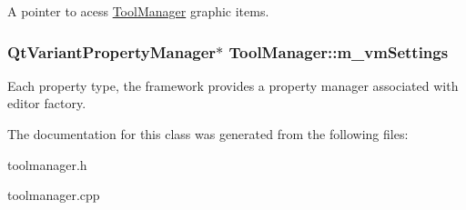 A pointer to acess \hyperlink{classToolManager}{Tool\-Manager} graphic items. \hypertarget{classToolManager_ac363f07b4d5b4d6b85f653d2590a730b}{
\subsubsection[{m\-\_\-vm\-Settings}]{\setlength{\rightskip}{0pt plus 5cm}Qt\-Variant\-Property\-Manager$\ast$ Tool\-Manager\-::m\-\_\-vm\-Settings\hspace{0.3cm}{\ttfamily [private]}}}\label{classToolManager_ac363f07b4d5b4d6b85f653d2590a730b}
Each property type, the framework provides a property manager associated with editor factory. 

The documentation for this class was generated from the following files\-:\begin{DoxyCompactItemize}
\item 
toolmanager.\-h\item 
toolmanager.\-cpp\end{DoxyCompactItemize}
